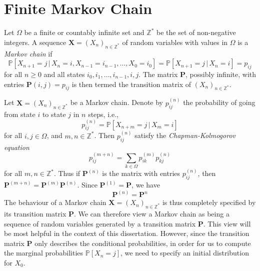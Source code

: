 \section{Finite Markov Chain}
\label{sec:finite-markov-chain}
\begin{definition}
  \label{def:6}
  Let $\Omega$ be a finite or countably infinite set and
  $\mathbb{Z}^{*}$ be the set of non-negative integers. A sequence
  $\mathbf{X} = (X_n)_{n \in \mathbb{Z}^{*}}$ of random variables with values in
  $\Omega$ is a {\em Markov chain} if
  \begin{equation}
    \label{eq:8}
    \mathbb{P}[X_{n+1} = j \, | \, X_n = i, X_{n-1} = i_{n-1},
    \dots, X_0 = i_0] = \mathbb{P}[X_{n+1} = j \, | \, X_n = i] =
    p_{ij}
  \end{equation}
  for all $n \geq 0$ and all states $i_0, i_1, \dots, i_{n-1}, i,
  j$. The matrix $\mathbf{P}$, possibly infinite, with entries
  $\mathbf{P}(i,j) = p_{ij}$ is then termed the transition matrix of
  $(X_n)_{n \in \mathbb{Z}^*}$.
\end{definition}
Let $\mathbf{X} = (X_n)_{n \in \mathbb{Z}^*}$ be a Markov
chain. Denote by $p_{ij}^{(n)}$ the probability of going from state
$i$ to state $j$ in $n$ steps, i.e.,
\begin{equation}
  \label{eq:11}
  p_{ij}^{(n)} = \mathbb{P}[ X_{n + m } = j \, | \, X_m = i]
\end{equation}
for all $i, j \in \Omega$, and $m,n \in \mathbb{Z}^{*}$. Then
$p_{ij}^{(n)}$ satisfy the {\em Chapman-Kolmogorov equation}
\begin{equation}
  \label{eq:12}
  p_{ij}^{(m+n)} = \sum_{k \in \Omega}{p_{ik}^{(m)}p_{kj}^{(n)}}
\end{equation}
for all $m,n \in \mathbb{Z}^{*}$. Thus if $\mathbf{P}^{(n)}$ is the
matrix with entries $p_{ij}^{(n)}$, then $\mathbf{P}^{(m+n)} =
\mathbf{P}^{(m)}\mathbf{P}^{(n)}$. Since $\mathbf{P}^{(1)} =
\mathbf{P}$, we have
\begin{equation}
  \label{eq:13}
  \mathbf{P}^{(n)} = \mathbf{P}^{n}
\end{equation}
The behaviour of a Markov chain $\mathbf{X} = (X_n)_{n \in
  \mathbb{Z}^{*}}$ is thus completely specified by its transition
matrix $\mathbf{P}$. We can therefore view a Markov chain as being a
sequence of random variables generated by a transition matrix
$\mathbf{P}$. This view will be most helpful in the context of this
dissertation. However, since the transition matrix $\mathbf{P}$ only describes
the conditional probabilities, in order for us to compute the marginal
probabilities $\mathbb{P}[X_n = j]$, we need to specify an initial
distribution for $X_0$.

